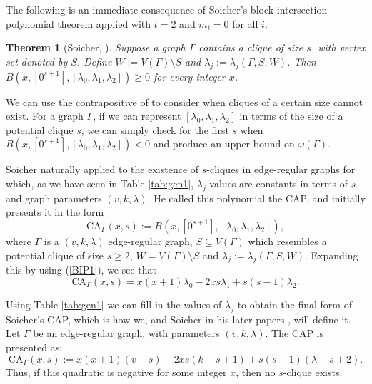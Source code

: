 \documentclass[11pt, baustms]{amsproc}
\theoremstyle{scplain}
\newtheorem{theorem}{Theorem}[section]
\newcommand\CA{\mathrm{CA}}
\renewcommand\ge{\geqslant}
\begin{document}
The following is an immediate consequence of Soicher's block-intersection polynomial theorem applied with \(t=2\) and \(m_i=0\) for all \(i\).

	\begin{theorem}[Soicher, {\cite[Theorem 3.1]{soicher_more_2010}}]
		\label{BIP}
	Suppose a graph $\Gamma$ contains a clique of size $s$, with vertex set denoted by $S$. Define $W := V(\Gamma) \setminus S$ and $\lambda_j:=\lambda_j(\Gamma, S, W)$. Then $B(x, [0^{s+1}], [\lambda_0, \lambda_1, \lambda_2]) \ge 0$ for every integer $x$.
	\end{theorem}
  
    We can use the contrapositive of  to consider when cliques of a certain size cannot exist. 
    For a graph $\Gamma$, if we can represent $[\lambda_0, \lambda_1, \lambda_2]$ in terms of the size of a potential clique $s$, we can simply check for the first $s$ when $B(x, [0^{s+1}], [\lambda_0, \lambda_1, \lambda_2]) < 0$ and produce an upper bound on $\omega(\Gamma)$.

    Soicher naturally applied  to the existence of $s$-cliques in edge-regular graphs for which, as we have seen in Table \ref{tab:gen1}, $\lambda_j$ values are constants in terms of $s$ and graph parameters $(v,k,\lambda)$. He called this polynomial the CAP, and initially presents it in the form
	\begin{equation}
		\CA_\Gamma(x,s) := B(x, [0^{s+1}], [\lambda_0,\lambda_1,\lambda_2]), \label{CAP}
	\end{equation}
	where $\Gamma$ is a $(v,k,\lambda)$ edge-regular graph, $S \subseteq V(\Gamma)$ which resembles a potential clique of size $s\ge 2$, $W = V(\Gamma) \setminus S$ and $\lambda_j := \lambda_j(\Gamma,S,W)$. Expanding this by using (\ref{BIP1}), we see that
	\begin{equation}
		\CA_\Gamma(x,s) = x(x+1)\lambda_0 -2x s \lambda_1+s(s-1)\lambda_2.  \label{CAP2}
	\end{equation}

	Using Table \ref{tab:gen1} we can fill in the values of $\lambda_j$ to obtain the final form of Soicher's CAP, which is how we, and Soicher in his later papers \cite{soicher_edge_2015}, will define it. Let $\Gamma$ be an edge-regular graph, with parameters $(v,k, \lambda)$. The CAP is presented as:
	\begin{equation*}
    \label{CAP1}
		\CA_\Gamma(x,s) := x(x+1)(v-s) -2x s (k-s+1)+s(s-1)(\lambda -s+2). 
	\end{equation*}
    Thus, if this quadratic is negative for some integer $x$, then no $s$-clique exists.
\end{document}
